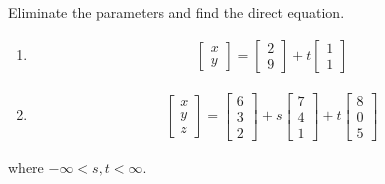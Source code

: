 \begin{Exercise}
Eliminate the parameters and find the direct equation.
\begin{enumerate}[label=(\alph*)]
\item \begin{align*}
\begin{bmatrix}
x\\
y
\end{bmatrix}
=
\begin{bmatrix}
2\\
9
\end{bmatrix}
+
t
\begin{bmatrix}
1\\
1
\end{bmatrix}
\end{align*}
\item \begin{align*}
\begin{bmatrix}
x\\
y\\
z
\end{bmatrix}
=
\begin{bmatrix}
6\\
3\\
2
\end{bmatrix}
+
s
\begin{bmatrix}
7\\
4\\
1
\end{bmatrix}
+
t
\begin{bmatrix}
8\\
0\\
5
\end{bmatrix}
\end{align*}
\end{enumerate}
where $-\infty < s,t < \infty$.
\end{Exercise}
